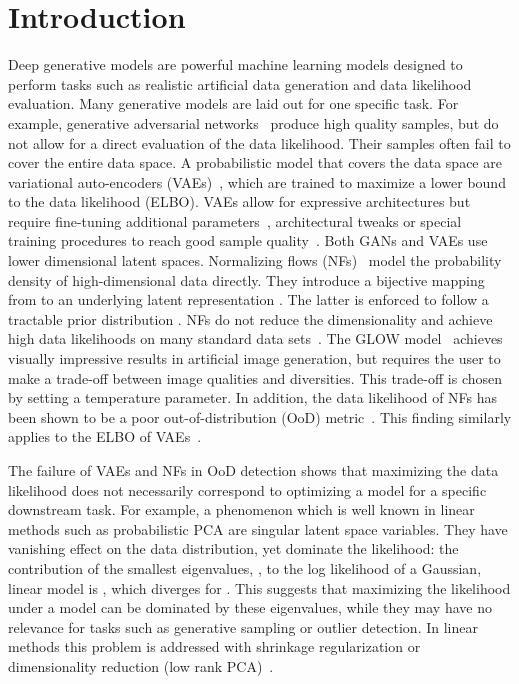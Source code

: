 \documentclass{article}
\begin{document}
\section{Introduction}
Deep generative models are powerful machine learning models designed to perform tasks such as realistic artificial data generation and  data likelihood evaluation. 
Many generative models are laid out for one specific task. For example, generative adversarial networks~\citep{GANs} produce high quality samples, but do not allow for a direct evaluation of the data likelihood. Their samples often fail to cover the entire data space. 
A probabilistic model that covers the data space are 
variational auto-encoders (VAEs)~\citep{ KingmaWelling13,RezendeMW14}, which are trained to maximize a lower bound to the data likelihood (ELBO). VAEs allow for expressive architectures but require fine-tuning additional parameters~\citep{beta-VAE}, architectural tweaks or special training procedures to reach good sample quality~\citep{FixElbo, RezendeMohamed15, VAEGAN}. Both GANs and VAEs use lower dimensional latent spaces. 
Normalizing flows (NFs)~\citep{RippelAdams13,DinhKB14,DinhSB16,KingmaD18,ffjord18,glow, nsf,NF_review} model the probability density  of high-dimensional data directly. They introduce a bijective mapping from  to an underlying latent representation . The latter is enforced to follow a tractable prior distribution . NFs do not reduce the dimensionality and achieve high data likelihoods on many standard data sets~\citep{GritsenkoSnoekEtAl19}. The GLOW model~\citep{glow} achieves visually impressive results in artificial image generation, but requires the user to make a trade-off between image qualities and diversities. This trade-off is chosen by setting a temperature parameter. In addition, the data likelihood of NFs has been shown to be a poor out-of-distribution (OoD) metric~\citep{Nalisnick2019}. This finding similarly applies to the ELBO of VAEs~\citep{Nalisnick2019}.

The failure of VAEs and NFs in OoD detection shows that 
maximizing the data likelihood does not necessarily correspond to optimizing a model for a specific downstream task. For example, a phenomenon which is well known in linear methods such as probabilistic PCA \citep{TippingBishop1999} are singular latent space variables. They have vanishing effect on the data distribution, yet dominate the likelihood: the contribution of the smallest eigenvalues, , to the log likelihood of a Gaussian, linear model is , which diverges for . This suggests that maximizing the likelihood under a model can be dominated by these eigenvalues, while they may have no relevance for tasks such as generative sampling or outlier detection. In linear methods this problem is addressed with shrinkage regularization \citep{LedoitWolf2004,LedoitWolf15} or dimensionality reduction (low rank PCA)~\citep{TippingBishop1999}. 
\end{document}
